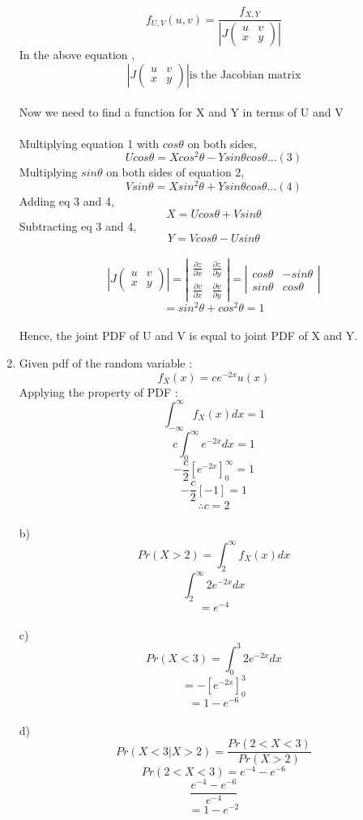 \documentclass{article}
\begin{document}
\begin{enumerate}
$$ f_{U,V}(u,v)=\frac{f_{X,Y}}{\left|J\left(\begin{matrix}
u & v \\
x & y
\end{matrix}\right)\right|}
$$
In the above equation ,
$$
\left|J\left(\begin{matrix}
u & v \\
x & y
\end{matrix}\right)\right| \text{is the Jacobian matrix} $$ 
\\
Now we need to find a function for X and Y in terms of U and V \\
\\
Multiplying equation 1 with $cos\theta$ on both sides, 
$$Ucos\theta = Xcos^2\theta-Ysin\theta cos\theta ... (3)$$
Multiplying $sin\theta$ on both sides of equation 2,
$$Vsin\theta=Xsin^2\theta + Ysin\theta cos\theta ... (4)$$
Adding eq 3 and 4, 
$$X=U cos\theta +Vsin\theta$$
Subtracting eq 3 and 4,
$$Y=Vcos\theta -U sin\theta$$
\\
$$
\left|J\left(\begin{matrix}
u & v \\
x & y
\end{matrix}\right)\right| =
 \left| 
\begin{matrix} 
\frac{\partial z}{\partial x} &  \frac{\partial z}{\partial y}\\
\frac{\partial v}{\partial x} &  \frac{\partial v}{\partial y}
\end{matrix}\right|
=\left|
\begin{matrix}
cos\theta & -sin\theta \\ sin\theta & cos\theta
\end{matrix}
\right|
$$
$$= sin^2\theta+cos^2\theta = 1$$
\\
Hence, the joint PDF of U and V  is equal to joint PDF of X and Y.\\

\newpage

\item
Given pdf of the random variable :
$$f_{X}(x)=ce^{-2x}u(x)$$
Applying the property of PDF :
$$\int_{-\infty}^{\infty}f_{X}(x)dx=1$$
$$c\int_{0}^{\infty}e^{-2x}dx=1$$
$$-\frac{c}{2}[e^{-2x}]_{0}^{\infty} = 1$$
$$ -\frac{c}{2}[-1]=1$$
$$\therefore c=2$$
\\
b) $$Pr(X>2)= \int_{2}^{\infty}f_{X}(x)dx$$
$$ \int_{2}^{\infty}2e^{-2x}dx $$
$$ = e^{-4}$$
\\
c) $$Pr(X<3) = \int_{0}^{3}2e^{-2x}dx $$
 $$ = -[e^{-2x}]_{0}^{3}$$
$$= 1-e^{-6}$$\\
d) $$ Pr(X<3 | X>2) = \frac{ Pr(2<X<3)}{Pr(X>2)}$$
$$Pr(2<X<3) = e^{-4}-e^{-6}$$
$$ \frac{e^{-4}-e^{-6}}{e^{-4}}$$
$$= 1-e^{-2}$$


\end{enumerate}
\end{document}
